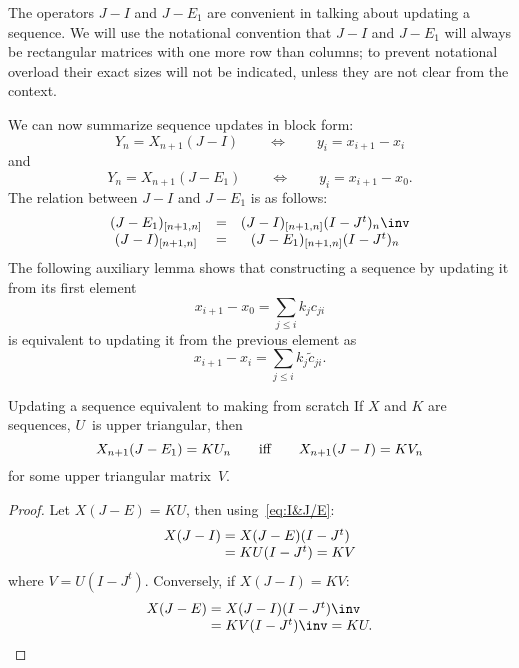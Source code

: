 The operators $J-I$ and $J-E_1$ are convenient in talking about
updating a sequence. We will use the notational convention that $J-I$
and $J-E_1$ will always be rectangular matrices with one more row than
columns; to prevent notational overload their exact sizes will not be
indicated, unless they are not clear from the context.

We can now summarize sequence updates in block form:
\begin{equation}
  Y_n=X_{n+1}(J-I)\qquad\Leftrightarrow\qquad y_i=x_{i+1}-x_i
  \label{eq:y-update-from-prev-x}
\end{equation}
and
\begin{equation}
  Y_n=X_{n+1}(J-E_1)\qquad\Leftrightarrow\qquad y_i=x_{i+1}-x_0.
  \label{eq:y-update-from-first-x}
\end{equation}
The relation between $J-I$ and $J-E_1$ is as follows:
\begin{equation}
  \begin{matrix}
    (J-E_1)_{[n+1,n]}&=&(J-I  )_{[n+1,n]}(I-J^t)_n\inv\\
    (J-I  )_{[n+1,n]}&=&(J-E_1)_{[n+1,n]}(I-J^t)_n
  \end{matrix} 
  \label{eq:I&J/E}
\end{equation}
The following auxiliary lemma shows that constructing a sequence by
updating it from its first element
        \[ x_{i+1}-x_0=\sum_{j\leq i}k_jc_{ji} \]
is equivalent to updating it from the previous element as
        \[ x_{i+1}-x_i=\sum_{j\leq i}k_j\tilde c_{ji}. \]

\begin{llemma}{Updating a sequence equivalent to making from scratch}
\label{lemma:IJ-IE-equiv}
If $X$ and $K$ are sequences, $U$~is upper triangular, then
\[ X_{n+1}(J-E_1)=KU_n \qquad\hbox{iff}\qquad X_{n+1}(J-I)=KV_n \]
for some upper triangular matrix~$V$. 
\end{llemma}
\begin{proof} 
Let $X(J-E)=KU$, then using~\eqref{eq:I&J/E}:
\[
\begin{array}{r@{{}={}}l}
X(J-I)&X(J-E)(I-J^t)\\ &KU(I-J^t)=KV
\end{array}
\]
where $V=U(I-J^t)$. Conversely, if $X(J-I)=KV$:
\[
\begin{array}{r@{{}={}}l}
X(J-E)&X(J-I)(I-J^t)\inv \\ &KV(I-J^t)\inv=KU.
\end{array}
\]
\end{proof}

